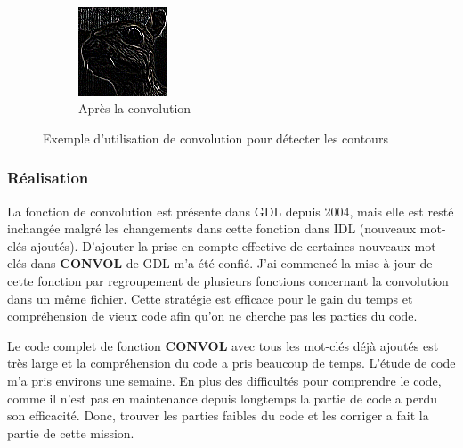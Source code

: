 \begin{figure}[!ht]
    ~~
    \begin{subfigure}[b]{0.3\textwidth}
    	\centering
    		\includegraphics[width=\textwidth]{./images/ex_edge_ch.png}
    		\caption{Après la convolution}
    		\label{ex_edge_ch}
    \end{subfigure}
        \caption{Exemple d'utilisation de convolution pour détecter les contours}
    \label{ex_edge}
\end{figure}

\subsubsection{Réalisation}
La fonction de convolution est présente dans GDL depuis 2004, mais elle est resté inchangée malgré les changements dans cette fonction dans IDL (nouveaux mot-clés ajoutés). D'ajouter la prise en compte effective de certaines nouveaux mot-clés dans \textbf{CONVOL} de GDL m'a été confié. J'ai commencé la mise à jour de cette fonction par regroupement de plusieurs fonctions concernant la convolution dans un même fichier. Cette stratégie est efficace pour le gain du temps et compréhension de vieux code afin qu'on ne cherche pas les parties du code.

Le code complet de fonction \textbf{CONVOL} avec tous les mot-clés déjà ajoutés est très large et la compréhension du code a pris beaucoup de temps. L’étude de code m'a pris environs une semaine. En plus des difficultés pour comprendre le code, comme il n'est pas en maintenance depuis longtemps la partie de code a perdu son efficacité. Donc, trouver les parties faibles du code et les corriger a fait la partie de cette mission.

